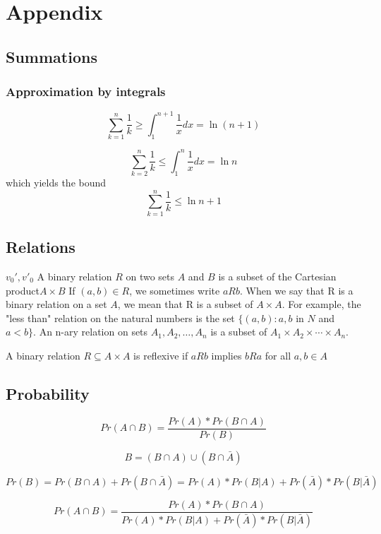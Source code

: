 \documentclass{article}
\begin{document}
\section{Appendix}
\subsection{Summations}
\subsubsection{Approximation by integrals}
$$
\sum_{k=1}^n \frac{ 1}{k} \geq \int_1^{n+1}\frac{1}{x}dx = \ln(n+1)
$$

$$
\sum_{k=2}^n \frac{ 1}{k} \leq \int_1^{n}\frac{1}{x}dx = \ln n
$$
which yields the bound
$$
\sum_{k=1}^n \frac{ 1}{k} \leq \ln n + 1
$$

\subsection{Relations}
$v_0',v'_0$
A binary relation $R$ on two sets $A$ and $B$ is a subset of the Cartesian product$A \times B$
If $(a, b) \in R$, we sometimes write $a R b$. When we say that R is a binary relation on a set $A$, we mean that R is a subset of $A \times A$. For example, the "less than" relation on the natural numbers is the set $\{(a, b) : a, b$ in $N$ and $a < b\}$. An n-ary relation on sets $A_1, A_2,\ldots, A_n$ is a subset of $A_1 \times A_2 \times \cdots \times  A_n$.

A binary relation $R \subseteq A \times A$ is reflexive if
$a R b$ implies $b R a$ for all $a,b \in A$
\subsection{Probability}
$$
Pr(A\cap B)=\frac{Pr(A)*Pr(B \cap A)}{Pr(B)}
$$

$$
B=(B \cap A)\cup (B \cap \bar{A})
$$

$$
Pr(B)=Pr(B \cap A)+Pr(B \cap \bar{A})
=Pr(A)*Pr(B|A)+Pr(\bar{A})*Pr(B|\bar{A})
$$

$$
Pr(A\cap B)=\frac{Pr(A)*Pr(B \cap A)}{Pr(A)*Pr(B|A)+Pr(\bar{A})*Pr(B|\bar{A})}
$$
\end{document}
